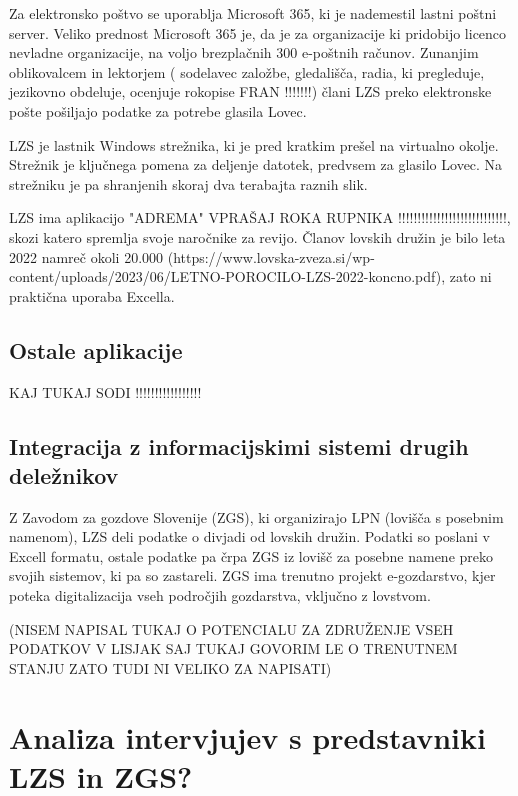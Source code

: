 \documentclass[a4paper,12pt,openright]{book}
\begin{document}
Za elektronsko poštvo se uporablja Microsoft 365, ki je nademestil lastni poštni server.
Veliko prednost Microsoft 365 je, da je za organizacije ki pridobijo licenco nevladne organizacije, na voljo brezplačnih 300 e-poštnih računov.
Zunanjim oblikovalcem in lektorjem ( sodelavec založbe, gledališča, radia, ki pregleduje, jezikovno obdeluje, ocenjuje rokopise FRAN !!!!!!!) člani LZS preko elektronske pošte pošiljajo podatke za potrebe glasila Lovec.

LZS je lastnik Windows strežnika, ki je pred kratkim prešel na virtualno okolje.
Strežnik je ključnega pomena za deljenje datotek, predvsem za glasilo Lovec.
Na strežniku je pa shranjenih skoraj dva terabajta raznih slik.

LZS ima aplikacijo "ADREMA" VPRAŠAJ ROKA RUPNIKA !!!!!!!!!!!!!!!!!!!!!!!!!!!!, skozi katero spremlja svoje naročnike za revijo. 
Članov lovskih družin je bilo leta 2022 namreč okoli 20.000 (https://www.lovska-zveza.si/wp-content/uploads/2023/06/LETNO-POROCILO-LZS-2022-koncno.pdf), zato ni praktična uporaba Excella.


\section{Ostale aplikacije}

KAJ TUKAJ SODI !!!!!!!!!!!!!!!!!

\section{Integracija z informacijskimi sistemi drugih deležnikov}

Z Zavodom za gozdove Slovenije (ZGS), ki organizirajo LPN (lovišča s posebnim namenom), LZS deli podatke o divjadi od lovskih družin.
Podatki so poslani v Excell formatu, ostale podatke pa črpa ZGS iz lovišč za posebne namene preko svojih sistemov, ki pa so zastareli.
ZGS ima trenutno projekt e-gozdarstvo, kjer poteka digitalizacija vseh področjih gozdarstva, vključno z lovstvom.

(NISEM NAPISAL TUKAJ O POTENCIALU ZA ZDRUŽENJE VSEH PODATKOV V LISJAK SAJ TUKAJ GOVORIM LE O TRENUTNEM STANJU ZATO TUDI NI VELIKO ZA NAPISATI)






\chapter{Analiza intervjujev s predstavniki LZS in ZGS?}
\label{analiza_intervjujev}
\end{document}
